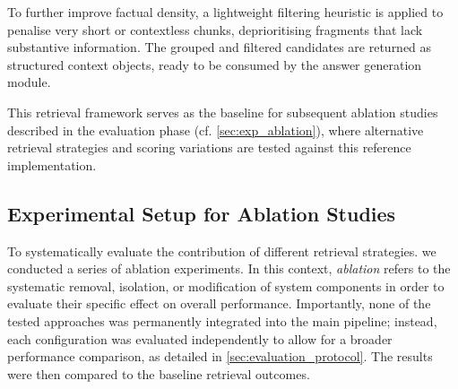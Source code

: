 \begin{spacing}{1.5}
To further improve factual density, a lightweight filtering heuristic is applied to penalise very short or contextless chunks, deprioritising fragments that lack substantive information. The grouped and filtered candidates are returned as structured context objects, ready to be consumed by the answer generation module. 

This retrieval framework serves as the baseline for subsequent ablation studies described in the evaluation phase (cf. \autoref{sec:exp_ablation}), where alternative retrieval strategies and scoring variations are tested against this reference implementation.

\subsection{Experimental Setup for Ablation Studies}\label{sec:exp_ablation}
To systematically evaluate the contribution of different retrieval strategies. we conducted a series of ablation experiments. In this context, \textit{ablation} refers to the systematic removal, isolation, or modification of system components in order to evaluate their specific effect on overall performance. Importantly, none of the tested approaches was permanently integrated into the main pipeline; instead, each configuration was evaluated independently to allow for a broader performance comparison, as detailed in \autoref{sec:evaluation_protocol}. The results were then compared to the baseline retrieval outcomes.


\end{spacing}
